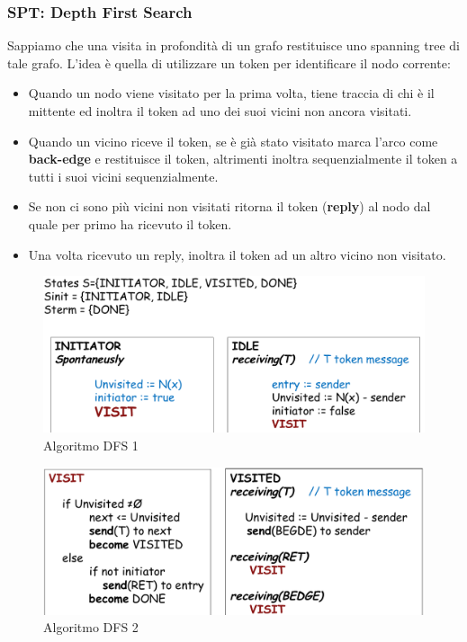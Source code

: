 \documentclass[12pt]{article}
\begin{document}
		\subsubsection{SPT: Depth First Search}
			Sappiamo che una visita in profondità di un grafo restituisce uno spanning tree di tale grafo.
			L'idea è quella di utilizzare un token per identificare il nodo corrente: 
			\begin{itemize}
				\item Quando un nodo viene visitato per la prima volta, tiene traccia di chi è il mittente ed inoltra il token ad uno dei suoi vicini non ancora visitati.
				\item Quando un vicino riceve il token, se è già stato visitato marca l'arco come \textbf{back-edge} e restituisce il token, altrimenti inoltra sequenzialmente il token a tutti i suoi vicini sequenzialmente.
				\item Se non ci sono più vicini non visitati ritorna il token (\textbf{reply}) al nodo dal quale per primo ha ricevuto il token.
				\item Una volta ricevuto un reply, inoltra il token ad un altro vicino non visitato. 
			\end{itemize}
			\begin{figure}[h!]
				\centering
				\includegraphics[scale=0.3]{img/dfs.png}
				\caption{Algoritmo DFS 1}
			\end{figure}
				\begin{figure}[h!]
				\centering
				\includegraphics[scale=0.3]{img/dfs2.png}
				\caption{Algoritmo DFS 2}
			\end{figure}
		
\end{document}
